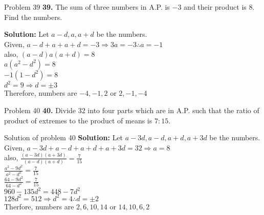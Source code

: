 \documentclass[aspectratio=1610,8pt]{beamer}
\begin{document}
\begin{frame}{Problem 39}
  \textbf{39.} The sum of three numbers in A.P. is $-3$ and their product is
  $8.$ Find the numbers.
\end{frame}
\begin{frame}
  \textbf{Solution:} Let $a - d, a, a + d$ be the numbers.\\
  Given, $a - d + a + a + d = -3 \Rightarrow 3a = -3 \therefore a = -1$\\
  also, $(a - d)a(a + d) = 8$\\
  $a(a^2 - d^2) = 8$\\
  $-1(1 - d^2) = 8$\\
  $d^2 = 9 \Rightarrow d = \pm 3$\\
  Therefore, numbers are $-4, -1, 2$ or $2, -1, -4$
\end{frame}
\begin{frame}{Problem 40}
  \textbf{40.} Divide $32$ into four parts which are in A.P. such that the
  ratio of product of extremes to the product of means is $7:15.$
\end{frame}
\begin{frame}{Solution of problem 40}
  \textbf{Solution:} Let $a - 3d, a - d, a + d, a + 3d$ be the numbers.\\
  Given, $a - 3d + a - d + a + d + a + 3d = 32 \Rightarrow a = 8$\\
  also, $\frac{(a - 3d)(a + 3d)}{(a - d)(a + d)} = \frac{7}{15}$\\
  $\frac{a^2 - 9d^2}{a^2 - d^2} = \frac{7}{15}$\\
  $\frac{64 - 9d^2}{64 - d^2} = \frac{7}{15}$\\
  $960 - 135d^2 = 448 - 7d^2$\\
  $128d^2 = 512 \Rightarrow d^2 = 4 \therefore d = \pm 2$\\
  Therfore, numbers are $2, 6, 10, 14$ or $14, 10, 6, 2$
\end{frame}
\end{document}
